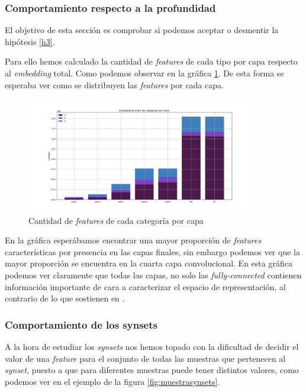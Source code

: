 \documentclass[12,twoside]{TFG-GM}
\theoremstyle{definition}
\theoremstyle{remark}
\begin{document}
\subsubsection{Comportamiento respecto a la profundidad}

El objetivo de esta sección es comprobar si podemos aceptar o desmentir la hipótesis \ref{h3}. 

Para ello hemos calculado la cantidad de \textit{features} de cada tipo por capa respecto al \textit{embedding} total. Como podemos observar en la gráfica \ref{fig:totalfeaturesperlayer}. De esta forma se esperaba ver como se distribuyen las \textit{features} por cada capa.


\begin{figure}[ht] 
	\centering
	\includegraphics[width=0.9\textwidth] {Images/plots/25/Comparative_of_synsets_all.png}
	\caption{ Cantidad de \textit{features} de cada categoría por capa
	\label{fig:totalfeaturesperlayer}}
\end{figure}

En la gráfica esperábamos encontrar una mayor proporción de \textit{features} características por presencia en las capas finales, sin embargo podemos ver que la mayor proporción se encuentra en la cuarta capa convolucional. En esta gráfica podemos ver claramente que todas las capas, no solo las \textit{fully-connected} contienen información importante de cara a caracterizar el espacio de representación, al contrario de lo que sostienen en \cite{onlylastlayers}.

\subsubsection{Comportamiento de los synsets}

A la hora de estudiar los \textit{synsets} nos hemos topado con la dificultad de decidir el valor de una \textit{feature} para el conjunto de todas las muestras que pertenecen al \textit{synset}, puesto a que para diferentes muestras puede tener distintos valores, como podemos ver en el ejemplo de la figura \ref{fig:muestrasynsets}. 
\end{document}
